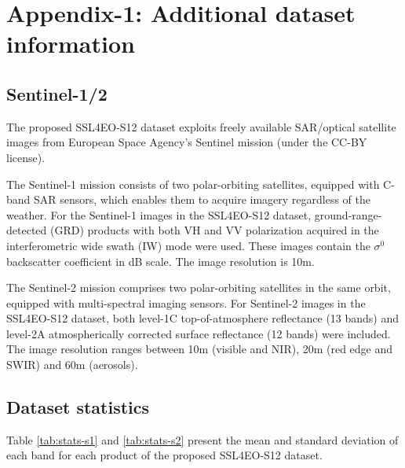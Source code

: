 \documentclass[lettersize,journal]{IEEEtran}
\begin{document}
\small{
\printbibliography[segment=0]
}








\onecolumn
\normalsize
\newrefsegment




\section*{\large\textbf{Appendix-1: Additional dataset information}}
\vspace{1em}



\subsection{\textbf{Sentinel-1/2}}
The proposed SSL4EO-S12 dataset exploits freely available SAR/optical satellite images from European Space Agency's Sentinel mission (under the CC-BY license). 

The Sentinel-1 mission \citep{torres2012gmes} consists of two polar-orbiting satellites, equipped with C-band SAR sensors, which enables them to acquire imagery regardless of the weather. For the Sentinel-1 images in the SSL4EO-S12 dataset, ground-range-detected (GRD) products with both VH and VV polarization acquired in the interferometric wide swath (IW) mode were used. These images contain the $\sigma^{0}$ backscatter coefficient in dB scale. The image resolution is 10m.

The Sentinel-2 mission \citep{drusch2012sentinel} comprises two polar-orbiting satellites in the same orbit, equipped with multi-spectral imaging sensors. For Sentinel-2 images in the SSL4EO-S12 dataset, both level-1C top-of-atmosphere reflectance (13 bands) and level-2A atmospherically corrected surface reflectance (12 bands) were included. The image resolution ranges between 10m (visible and NIR), 20m (red edge and SWIR) and 60m (aerosols).

\subsection{\textbf{Dataset statistics}} Table \ref{tab:stats-s1} and \ref{tab:stats-s2} present the mean and standard deviation of each band for each product of the proposed SSL4EO-S12 dataset.


\begin{table}[h]
\caption{Statistics of Sentinel-1 images in the SSL4EO-S12 dataset.}
\label{tab:stats-s1}
\centering

\end{table}
\vspace{-1em}
\end{document}
